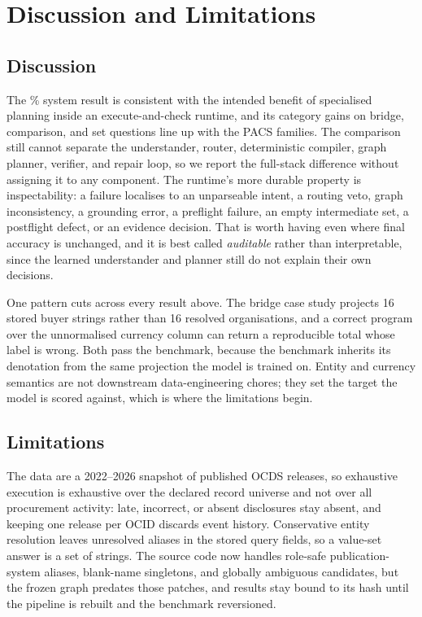 \section{Discussion and Limitations}
\label{sec:analysis}
\label{sec:limitations}

\subsection{Discussion}

The \RuntimeOurs\% system result is consistent with the intended benefit of specialised planning
inside an execute-and-check runtime, and its category gains on bridge, comparison, and set
questions line up with the PACS families.  The comparison still cannot separate the understander,
router, deterministic compiler, graph planner, verifier, and repair loop, so we report the
full-stack difference without assigning it to any component.  The runtime's more durable property
is inspectability: a failure localises to an unparseable intent, a routing veto, graph
inconsistency, a grounding error, a preflight failure, an empty intermediate set, a postflight
defect, or an evidence decision.  That is worth having even where final accuracy is unchanged, and
it is best called \emph{auditable} rather than interpretable, since the learned understander and
planner still do not explain their own decisions.

One pattern cuts across every result above.  The bridge case study projects 16 stored buyer
strings rather than 16 resolved organisations, and a correct program over the unnormalised
currency column can return a reproducible total whose label is wrong.  Both pass the benchmark,
because the benchmark inherits its denotation from the same projection the model is trained on.
Entity and currency semantics are not downstream data-engineering chores; they set the target the
model is scored against, which is where the limitations begin.

\subsection{Limitations}

The data are a 2022--2026 snapshot of published OCDS releases, so exhaustive execution is
exhaustive over the declared record universe and not over all procurement activity: late,
incorrect, or absent disclosures stay absent, and keeping one release per OCID discards event
history.  Conservative entity resolution leaves unresolved aliases in the stored query fields, so
a value-set answer is a set of strings.  The source code now handles role-safe
publication-system aliases, blank-name singletons, and globally ambiguous candidates, but the
frozen graph predates those patches, and results stay bound to its hash until the pipeline is
rebuilt and the benchmark reversioned.

